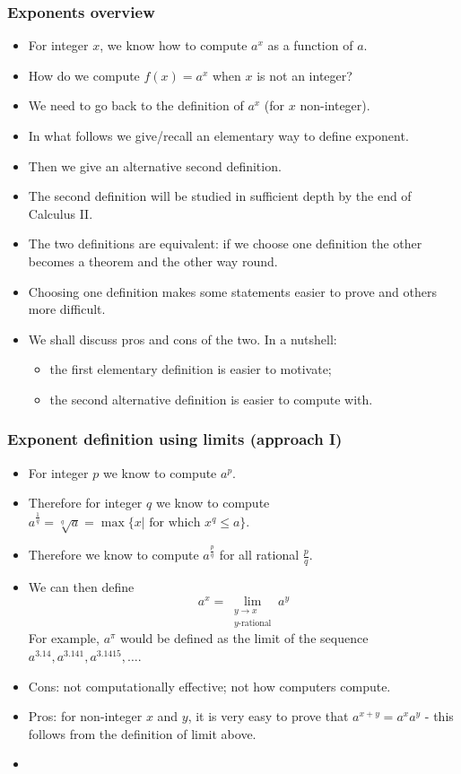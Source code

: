 \begin{frame}
\frametitle{Exponents overview}
\begin{itemize}
\item<1-> For integer $x$, we know how to compute $a^{x}$ as a function of $a$. 
\item<2-> How do we compute $f(x)=a^x$ when $x$ is not an integer?
\item<3-> We need to go back to the definition of $a^x$ (for $x$ non-integer).
\item<4-> In what follows we give/recall an elementary way to define exponent.
\item<5-> Then we give an alternative second definition. 
\item<6-> The second definition will be studied in sufficient depth by the end of Calculus II. 
\item<7-> The two definitions are equivalent: if we choose one definition the other becomes a theorem and the other way round.
\item<8-> Choosing one definition makes some statements easier to prove and others more difficult.
\item<9-> We shall discuss pros and cons of the two. In a nutshell: 
\begin{itemize}
\item<10-> the first elementary definition is easier to motivate;
\item<11-> the second alternative definition is easier to compute with.
\end{itemize}
\end{itemize}
\end{frame}
\begin{frame}
\frametitle{Exponent definition using limits (approach I)}
\begin{itemize}
\item<1-> For integer $p$ we know to compute $a^p$.
\item<2-> Therefore for integer $q$ we know to compute $a^{\frac{1}{q}}= \sqrt[q]{a}=\max\{x|\text{~for~which~} x^q\leq a\}$.
\item<3-> Therefore we know to compute $a^{\frac{p}{q}}$ for all rational $\frac{p}{q}$.
\item<4-> We can then define
\[
a^x = \lim\limits_{\substack{y \to x \\ y\text{-rational}}} a^y 
\]
For example, $a^\pi$ would be defined as the limit of the sequence $a^{3.14}, a^{3.141}, a^{3.1415}, \dots$.
\item<5-> Cons: not computationally effective; not how computers compute.
\item<6-> Pros: for non-integer $x$ and $y$, it is very easy to prove that $a^{x+y}=a^xa^y$ - this follows from the definition of limit above.
\item<7->
\end{itemize}
\end{frame}
